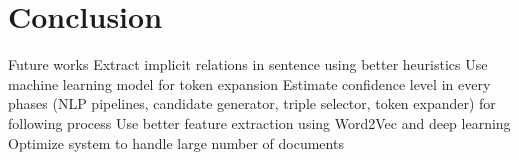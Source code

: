 \documentclass[conference,compsoc]{IEEEtran}
\begin{document}
\lipsum[6-7]

\section{Conclusion}


Future works
Extract implicit relations in sentence using better heuristics
Use machine learning model for token expansion
Estimate confidence level in every phases (NLP pipelines, candidate generator, triple selector, token expander) for following process
Use better feature extraction using Word2Vec and deep learning
Optimize system to handle large number of documents

\lipsum[6-7]






\end{document}
